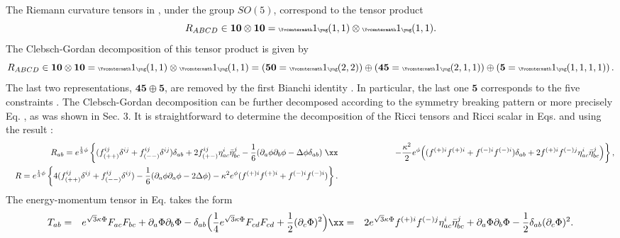 \documentclass[12pt,epsf]{article}
\begin{document}
The Riemann curvature tensors in , under the group $SO(5)$, correspond
to the tensor product
\begin{equation} \label{yt-riemann}
R_{ABCD} \in \mathbf{10} \otimes \mathbf{10}
= {\tiny  \Yvcentermath1 \yng(1,1)} \otimes {\tiny  \Yvcentermath1 \yng(1,1)}.
\end{equation}
The Clebsch-Gordan decomposition of this tensor product is given by
\begin{equation} \label{yt-riemann-dec}
R_{ABCD} \in \mathbf{10} \otimes \mathbf{10}
= {\tiny  \Yvcentermath1 \yng(1,1)} \otimes {\tiny  \Yvcentermath1 \yng(1,1)}
=  \left(\mathbf{50} = {\tiny  \Yvcentermath1 \yng(2,2)} \right)
 \oplus \left(\mathbf{45}
= {\tiny  \Yvcentermath1 \yng(2,1,1)} \right) \oplus \left( \mathbf{5}
= {\tiny  \Yvcentermath1 \yng(1,1,1,1)} \right).
\end{equation}
The last two representations, $\mathbf{45} \oplus \mathbf{5}$, are removed
by the first Bianchi identity .
In particular, the last one $\mathbf{5}$ corresponds to the five constraints .
The Clebsch-Gordan decomposition  can be further decomposed according
to the symmetry breaking pattern  or more precisely Eq. , as was shown in Sec. 3.
It is straightforward to determine the decomposition of
the Ricci tensors and Ricci scalar in Eqs.  and  using the result :
\begin{eqnarray} \label{ricci-decomp}
  && R_{ab} =  e^{\frac{1}{3} \phi} \left\{ (f^{ij}_{(++)} \delta^{ij} + f^{ij}_{(--)} \delta^{ij} ) \delta_{ab}
  + 2 f^{ij}_{(+-)}  \eta^i_{ac} \bar{\eta}^j_{bc}
  - \frac{1}{6} ( \partial_a \phi \partial_b \phi - \Delta \phi \delta_{ab} ) \right. \xx
&& \hspace{2cm} \left. - \frac{\kappa^2}{2} e^\phi \Big( (f^{(+)i} f^{(+)i} + f^{(-)i} f^{(-)i})\delta_{ab} + 2 f^{(+)i} f^{(-)j}
\eta^i_{ac} \bar{\eta}^j_{bc} \Big) \right\}, \\
\label{scalar-decomp}
&& R =  e^{\frac{1}{3} \phi} \left\{ 4 (f^{ij}_{(++)} \delta^{ij} + f^{ij}_{(--)} \delta^{ij} )
  - \frac{1}{6} ( \partial_a \phi \partial_a \phi - 2 \Delta \phi  )
  - \kappa^2 e^\phi (f^{(+)i} f^{(+)i} + f^{(-)i} f^{(-)i}) \right\}. \nonumber
\end{eqnarray}
The energy-momentum tensor in Eq.  takes the form \cite{joy-jhep}
\begin{eqnarray} \label{em-decom}
 T_{ab} &=& e^{\sqrt{3} \kappa \Phi}  F_{ac} F_{bc}
 + \partial_a \Phi \partial_b \Phi
 - \delta_{ab} \Big( \frac{1}{4} e^{\sqrt{3} \kappa \Phi} F_{cd} F_{cd}
  + \frac{1}{2} (\partial_c \Phi)^2 \Big) \xx
  &=& 2 e^{\sqrt{3} \kappa \Phi} f^{(+)i} f^{(-)j} \eta^i_{ac} \bar{\eta}^j_{bc}
  + \partial_a \Phi \partial_b \Phi
 - \frac{1}{2} \delta_{ab} (\partial_c \Phi)^2.
\end{eqnarray}
\end{document}
